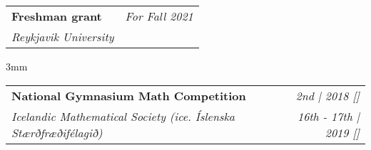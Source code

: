 \documentclass{article}
\makeatletter
\newcommand{\resumeProject}[4]{
\vspace{0.5mm}
    \begin{tabular*}{0.98\textwidth}[t]{l@{\extracolsep{\fill}}r}
        \textbf{#1} & \textit{\footnotesize{#3}} \\
        \footnotesize{\textit{#2}} & \footnotesize{#4}
    \end{tabular*}
    \vspace{-2.4mm}
}
\newcommand{\resumeItemListStart}{\begin{itemize}[leftmargin=*,labelsep=1mm,itemsep=0.5mm]}
\newcommand{\resumeSubHeadingListEnd}{}
\newcommand{\resumeItemListEnd}{\end{itemize}\vspace{-2mm}}
\makeatother
\begin{document}
\resumeProject
  {Freshman grant}
  {Reykjavik University}
  {For Fall 2021}

\vspace{3mm}

\resumeProject
  {National Gymnasium Math Competition}
  {Icelandic Mathematical Society (ice. Íslenska Stærðfræðifélagið)}
  {2nd | 2018 {}[\href{https://www.stae.is/stak/keppnin2018}{\textcolor{black}{\faIcon{globe}}}]}
  {\textit{16th - 17th | 2019 {}[\href{https://www.stae.is/stak/keppnin2019}{\textcolor{black}{\faIcon{globe}}}]}}

\resumeSubHeadingListEnd

%
%
%
\end{document}
